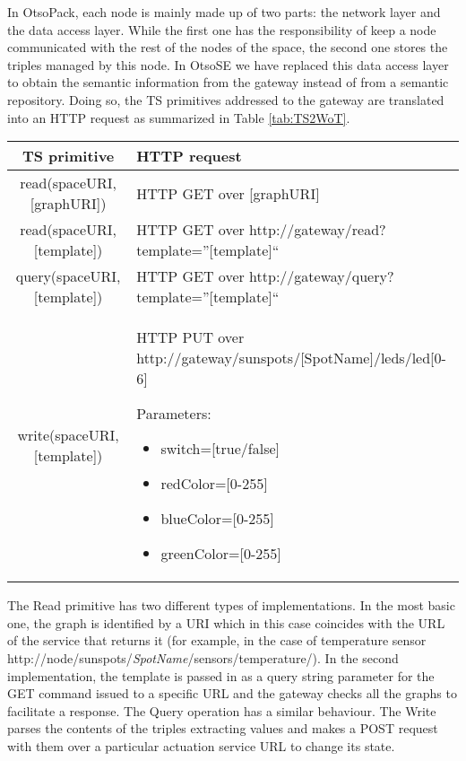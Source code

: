 In OtsoPack, each node is mainly made up of two parts: the network layer and the data access layer. While the first one has the responsibility of
keep a node communicated with the rest of the nodes of the space, the second one stores the triples managed by this node.
In OtsoSE we have replaced this data access layer to obtain the semantic information from the gateway instead of from a semantic repository.
Doing so, the TS primitives addressed to the gateway are translated into an HTTP request as summarized in Table \ref{tab:TS2WoT}.
\begin{table*}[t!] %
\centering
\caption {Mappings between OtsoPack's primitives and HTTP requests addressed to a WoT solution.}
\begin{tabular}{|c|p{10cm}|}
\hline
TS primitive & HTTP request \\
\hline \hline
read(spaceURI,[graphURI]) & HTTP GET over [graphURI] \\
\hline
read(spaceURI,[template]) & HTTP GET over http://gateway/read?template={''[template]``} \\
\hline
query(spaceURI,[template]) & HTTP GET over http://gateway/query?template={''[template]``}\\
\hline
write(spaceURI,[template]) & HTTP PUT over http://gateway/sunspots/[SpotName]/leds/led[0-6]

Parameters:
\begin{itemize}
  \item switch=[true/false]
  \item redColor=[0-255]
  \item blueColor=[0-255]
  \item greenColor=[0-255]
\end{itemize}

\\
\hline
\end{tabular}
\label{tab:TS2WoT}
\end{table*}

The Read primitive has two different types of implementations. In the most basic one, the graph is identified by a URI which in this case
coincides with the URL of the service that returns it (for example, in the case of temperature sensor
http://node/sunspots/\textit{SpotName}/sensors/temperature/). In the second implementation, the template is passed in as a query string parameter for
the GET command issued to a specific URL and the gateway checks all the graphs to facilitate a response. The Query operation has a similar behaviour.
The Write parses the contents of the triples extracting values and makes a POST request with them over a particular actuation service URL to change
its state.


